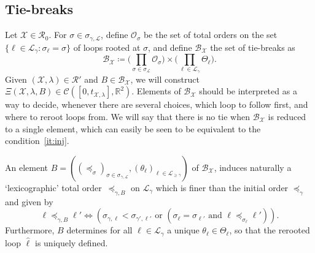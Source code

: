 \documentclass[11pt]{article}
\def\Conf{{\mathscr{R}}}
\def\Att{{\Xi}}
\begin{document}
\subsection{Tie-breaks}
\label{sub:tie}
Let $\mathcal{X}\in\Conf_0$. For $\sigma\in \sigma_{\gamma,\mathcal{L}}$, define $\mathcal{O}_\sigma$ be the set of total orders on the set $\{ \ell \in \mathcal{L}_\gamma : \sigma_\ell=\sigma \}$ of loops rooted at $\sigma$, and define $\mathcal{B}_{\mathcal{X}}$ the set of tie-breaks as
\[
\mathcal{B}_{\mathcal{X}}\coloneqq \Big(\prod_{\sigma \in \sigma_\mathcal{L} }  \mathcal{O}_\sigma \Big) \times \Big( \prod_{\ell \in \mathcal{L}_{\gamma}} \Theta_\ell\Big).
\]
Given $(\mathcal{X},\lambda)\in \Conf'$ and $B\in \mathcal{B}_{\mathcal{X}}$, we will construct $\Att(\mathcal{X},\lambda,B)\in \mathcal{C}([0,t_{\mathcal{X},\lambda} ], \mathbb{R}^2)$.
Elements of
$\mathcal{B}_{\mathcal{X}}$ should be interpreted as a way to decide, whenever there are several choices, which loop to follow first, and where to reroot loops from.
We will say that there is no tie when $\mathcal{B}_{\mathcal{X}}$ is reduced to a single element, which can easily be seen to be equivalent to the condition~\eqref{it:inj}.

An element $B=( (\preceq_\sigma)_{\sigma\in \sigma_{\gamma,\mathcal{L}}}, (\theta_\ell)_{\ell \in \mathcal{L}_{\geq \gamma} }  )$  of $\mathcal{B}_{\mathcal{X}}$, induces naturally a
`lexicographic' total order~$\preceq_{\gamma,B}$ on $\mathcal{L}_\gamma$ which is finer than the initial order $\preceq_\gamma$ and given by
\[
\ell\preceq_{\gamma,B} \ell' \iff ( \sigma_{\gamma,\ell} < \sigma_{\gamma',\ell'} \mbox{ or }  (\sigma_\ell = \sigma_{\ell'} \mbox{ and } \ell \preceq_{\sigma_\ell} \ell' )).
\]
Furthermore, $B$ determines for all $\ell\in \mathcal{L}_\gamma$ a unique $\theta_\ell\in \Theta_\ell$, so that the rerooted loop $\hat{\ell}$ is uniquely defined.
\end{document}
